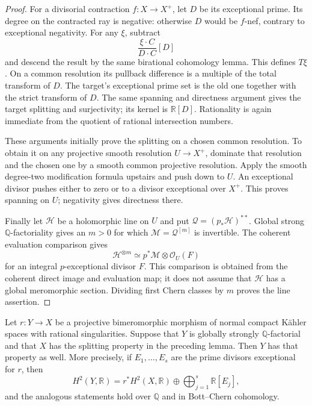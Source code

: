 \begin{proof}
For a divisorial contraction $f:X\to X^+$, let $D$ be its
exceptional prime. Its degree on the contracted ray is negative:
otherwise $D$ would be $f$-nef, contrary to exceptional negativity.
For any $\xi$, subtract
\[
                    \frac{\xi\cdot C}{D\cdot C}[D]
\]
and descend the result by the same birational cohomology lemma.
This defines $T\xi$. On a common resolution its pullback difference
is a multiple of the total transform of $D$. The target's exceptional
prime set is the old one together with the strict transform of $D$.
The same spanning and directness argument gives the target splitting
and surjectivity; its kernel is $\mathbb R[D]$. Rationality is again
immediate from the quotient of rational intersection numbers.

These arguments initially prove the splitting on a chosen common
resolution. To obtain it on any projective smooth resolution
$U\to X^+$, dominate that resolution and the chosen one by a smooth
common projective resolution. Apply the smooth degree-two
modification formula upstairs and push down to $U$. An exceptional
divisor pushes either to zero or to a divisor exceptional over $X^+$.
This proves spanning on $U$; negativity gives directness there.

Finally let $\mathcal H$ be a holomorphic line on $U$ and put
$\mathcal Q=(p_*\mathcal H)^{**}$. Global strong
$\mathbb Q$-factoriality gives an $m>0$ for which
$\mathcal M=\mathcal Q^{[m]}$ is invertible. The coherent evaluation
comparison gives
\[
                  \mathcal H^{\otimes m}
                  \simeq p^*\mathcal M\otimes\mathcal O_U(F)
\]
for an integral $p$-exceptional divisor $F$. This comparison is
obtained from the coherent direct image and evaluation map; it does
not assume that $\mathcal H$ has a global meromorphic section.
Dividing first Chern classes by $m$ proves the line assertion.
\end{proof}


\begin{corollary}
\label{prog:extraction-cohomology}
Let $r:Y\to X$ be a projective bimeromorphic morphism of normal compact
K\"ahler spaces with rational singularities. Suppose that $Y$ is globally
strongly $\mathbb Q$-factorial and that $X$ has the splitting property in
the preceding lemma. Then $Y$ has that property as well. More precisely,
if $E_1,\ldots,E_s$ are the prime divisors exceptional for $r$, then
\[
 H^2(Y,\mathbb R)
   =r^*H^2(X,\mathbb R)\oplus
      \bigoplus_{j=1}^{s}\mathbb R[E_j],
\]
and the analogous statements hold over $\mathbb Q$ and in
Bott--Chern cohomology.
\end{corollary}

